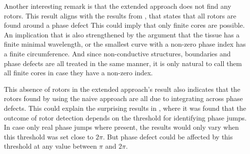 \documentclass[twocolumn]{article}
\begin{document}
Another interesting remark is
that the extended approach does not find any rotors.
This result aligns with the results from \autocite{tomii2021spatial},
that states that all rotors are found around a phase defect
This could imply that only finite cores are possible.
An implication that is also strengthened by the argument that the
tissue has a finite minimal wavelength,
or the smallest curve with a non-zero phase index has a finite circumference.
And since non-conductive structures, boundaries
and phase defects are all treated in the same manner,
it is only natural to call them all finite cores in case they have a non-zero index.

This absence of rotors in the extended approach's result also
indicates that the rotors found
by using the naive approach are all due to integrating across phase defects.
This could explain the surprising results in \textcite{li2020standardizing},
where it was found that the outcome of rotor detection
depends on the threshold for identifying phase jumps.
In case only real phase jumps where present,
the results would only vary when this threshold was set close to $2\pi$.
But phase defect could be affected by this threshold
at any value between $\pi$ and $2\pi$.


\end{document}
